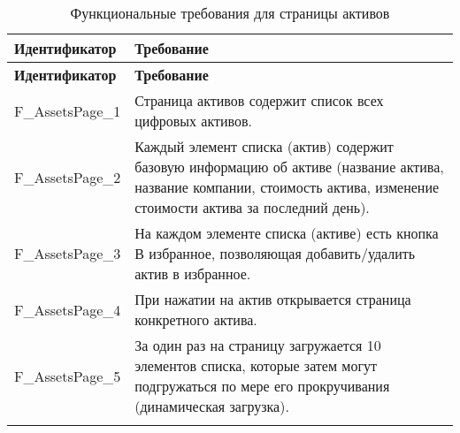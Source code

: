 \documentclass[a4paper, 14pt]{article}
\begin{document}
\begin{longtable}{| p{} | p{} |}
    \hline
    \textbf{Идентификатор}          & \textbf{Требование}                                                                                                                                                                \\
    \hline
    \endfirsthead
    \hline
    \textbf{Идентификатор}          & \textbf{Требование}                                                                                                                                                                \\
    \hline
    \endhead

    F\_AssetsPage\_1                & Страница активов содержит список всех цифровых активов.                                                                                                                            \\ \hline
    F\_AssetsPage\_2                & Каждый элемент списка (актив) содержит базовую информацию об активе (название актива, название компании, стоимость актива, изменение стоимости актива за последний день).                                                        \\ \hline
    F\_AssetsPage\_3                & На каждом элементе списка (активе) есть кнопка В избранное, позволяющая добавить/удалить актив в избранное.                                                                        \\ \hline
    F\_AssetsPage\_4                & При нажатии на актив открывается страница конкретного актива.                                                                                                                      \\ \hline
    F\_AssetsPage\_5                & За один раз на страницу загружается 10 элементов списка, которые затем могут подгружаться по мере его прокручивания (динамическая загрузка).                                       \\ \hline

    \caption{Функциональные требования для страницы активов}
\end{longtable}
\end{document}

